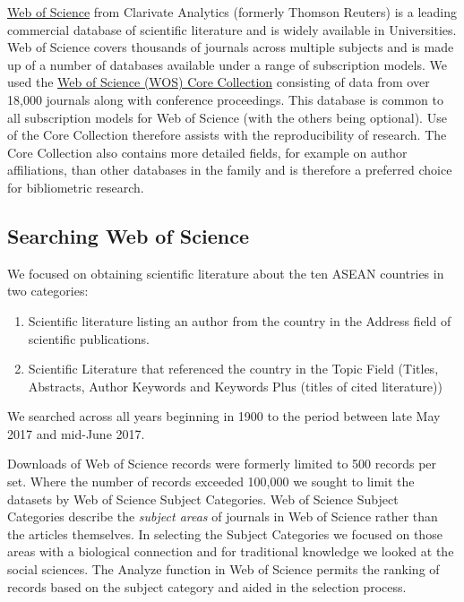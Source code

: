 \documentclass[]{book}
\providecommand{\tightlist}{%
  \setlength{\itemsep}{0pt}\setlength{\parskip}{0pt}}
\theoremstyle{definition}
\theoremstyle{definition}
\theoremstyle{definition}
\theoremstyle{remark}
\begin{document}
\href{https://clarivate.com/products/web-of-science/web-science-form/web-science-core-collection/}{Web
of Science} from Clarivate Analytics (formerly Thomson Reuters) is a
leading commercial database of scientific literature and is widely
available in Universities. Web of Science covers thousands of journals
across multiple subjects and is made up of a number of databases
available under a range of subscription models. We used the
\href{https://clarivate.com/products/web-of-science/web-science-form/web-science-core-collection/}{Web
of Science (WOS) Core Collection} consisting of data from over 18,000
journals along with conference proceedings. This database is common to
all subscription models for Web of Science (with the others being
optional). Use of the Core Collection therefore assists with the
reproducibility of research. The Core Collection also contains more
detailed fields, for example on author affiliations, than other
databases in the family and is therefore a preferred choice for
bibliometric research.

\hypertarget{searching-web-of-science}{%
\subsection{Searching Web of Science}\label{searching-web-of-science}}

We focused on obtaining scientific literature about the ten ASEAN
countries in two categories:

\begin{enumerate}
\def\labelenumi{\arabic{enumi}.}
\tightlist
\item
  Scientific literature listing an author from the country in the
  Address field of scientific publications.
\item
  Scientific Literature that referenced the country in the Topic Field
  (Titles, Abstracts, Author Keywords and Keywords Plus (titles of cited
  literature))
\end{enumerate}

We searched across all years beginning in 1900 to the period between
late May 2017 and mid-June 2017.

Downloads of Web of Science records were formerly limited to 500 records
per set. Where the number of records exceeded 100,000 we sought to limit
the datasets by Web of Science Subject Categories. Web of Science
Subject Categories describe the \emph{subject areas} of journals in Web
of Science rather than the articles themselves. In selecting the Subject
Categories we focused on those areas with a biological connection and
for traditional knowledge we looked at the social sciences. The Analyze
function in Web of Science permits the ranking of records based on the
subject category and aided in the selection process.
\end{document}
